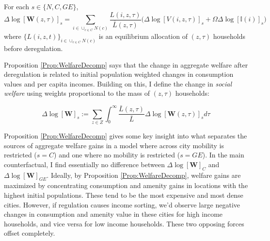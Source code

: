 
\begin{Proposition}\label{Prop:WelfareDecomp}
	For each $s \in \{N, C, GE\}$, \\
	\begin{equation*}
		\Delta \log[\boldsymbol{W}(z, \tau)]_{s} = \sum_{i \in \cup_{c \in C}N(c)}\frac{L(i, z, \tau)}{\bar{L}(z, \tau)}\bigg(\Delta\log[V(i, z, \tau)]_{s} + \Omega\Delta\log[\mathbb{I}(i)]_{s}\bigg)
	\end{equation*}
	where $\{L(i, z, t)\}_{i \in \cup_{c\in C}N(c)}$ is an equilibrium allocation of $(z, \tau)$ households before deregulation. 
\end{Proposition}

Proposition \ref{Prop:WelfareDecomp} says that the change in aggregate welfare after deregulation is related to initial population weighted changes in consumption values and per capita incomes. Building on this, I define the change in \textit{social welfare} using weights proportional to the mass of $(z, \tau)$ households:

\begin{equation*}
	\Delta \log[\boldsymbol{W}]_{s} := \sum_{z\in Z}\int_{0}^{\infty}\frac{\bar{L}(z, \tau)}{\bar{L}}\Delta \log[\boldsymbol{W}(z, \tau)]_{s}d\tau
\end{equation*}

Proposition \ref{Prop:WelfareDecomp} gives some key insight into what separates the sources of aggregate welfare gains in a model where across city mobility is restricted ($s = C$) and one where no mobility is restricted ($s = GE$). In the main counterfactual, I find essentially no difference between $\Delta \log[\boldsymbol{W}]_{C}$ and $\Delta \log[\boldsymbol{W}]_{GE}$. Ideally, by Proposition \ref{Prop:WelfareDecomp}, welfare gains are maximized by concentrating consumption and amenity gains in locations with the highest initial populations. These tend to be the most expensive and most dense cities. However, if regulation causes income sorting, we'd observe large negative changes in consumption and amenity value in these cities for high income households, and vice versa for low income households. These two opposing forces offset completely. 

